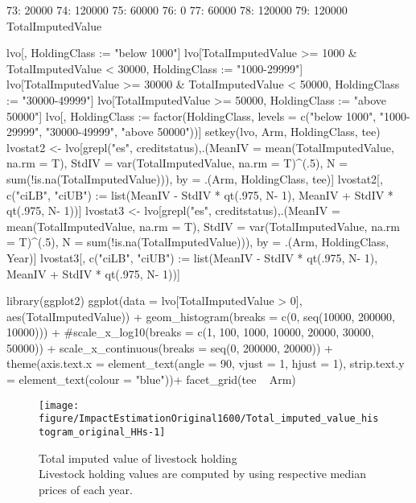 \begin{Schunk}
\begin{Soutput}
73:             20000
74:            120000
75:             60000
76:                 0
77:             60000
78:            120000
79:            120000
    TotalImputedValue
\end{Soutput}
\begin{Sinput}
lvo[, HoldingClass := "below 1000"]
lvo[TotalImputedValue >= 1000 & TotalImputedValue < 30000, 
  HoldingClass := "1000-29999"]
lvo[TotalImputedValue >= 30000 & TotalImputedValue < 50000, 
  HoldingClass := "30000-49999"]
lvo[TotalImputedValue >= 50000, 
  HoldingClass := "above 50000"]
lvo[, HoldingClass := factor(HoldingClass, 
  levels = c("below 1000", "1000-29999", "30000-49999", "above 50000"))]
setkey(lvo, Arm, HoldingClass, tee)
lvostat2 <- lvo[grepl("es", creditstatus),.(MeanIV = mean(TotalImputedValue, na.rm = T), 
  StdIV = var(TotalImputedValue, na.rm = T)^(.5), 
  N = sum(!is.na(TotalImputedValue))), by = .(Arm, HoldingClass, tee)]
lvostat2[, c("ciLB", "ciUB") := list(MeanIV - StdIV * qt(.975, N- 1), MeanIV + StdIV * qt(.975, N- 1))]
lvostat3 <- lvo[grepl("es", creditstatus),.(MeanIV = mean(TotalImputedValue, na.rm = T), 
  StdIV = var(TotalImputedValue, na.rm = T)^(.5), 
  N = sum(!is.na(TotalImputedValue))), by = .(Arm, HoldingClass, Year)]
lvostat3[, c("ciLB", "ciUB") := list(MeanIV - StdIV * qt(.975, N- 1), MeanIV + StdIV * qt(.975, N- 1))]
\end{Sinput}
\end{Schunk}
\begin{Schunk}
\begin{Sinput}
library(ggplot2)
ggplot(data = lvo[TotalImputedValue > 0], aes(TotalImputedValue)) + 
  geom_histogram(breaks = c(0, seq(10000, 200000, 10000))) + 
  #scale_x_log10(breaks = c(1, 100, 1000, 10000, 20000, 30000, 50000)) +
  scale_x_continuous(breaks = seq(0, 200000, 20000)) +
  theme(axis.text.x = element_text(angle = 90, vjust = 1, hjust = 1), 
   strip.text.y = element_text(colour = "blue"))+
  facet_grid(tee ~ Arm)
\end{Sinput}
\begin{figure}

{\centering \texttt{[image: figure/ImpactEstimationOriginal1600/Total\_imputed\_value\_histogram\_original\_HHs-1]} 

}

\caption{Total imputed value of livestock holding\\ {\footnotesize Livestock holding values are computed by using respective median prices of each year.\setlength{\baselineskip}{8pt}}}\label{Figure Total imputed value histogram original HHs}
\end{figure}
\end{Schunk}
